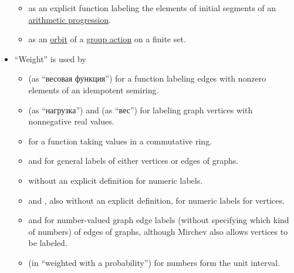 \begin{remark}
\begin{itemize}
\begin{itemize}
      \item {} as an explicit function labeling the elements of initial segments of an \hyperref[def:arithmetic_progression]{arithmetic progression}.

      \item {} as an \hyperref[def:group_action_orbit]{orbit} of a \hyperref[def:group_action]{group action} on a finite set.
    \end{itemize}

    \item \enquote{Weight} is used by
    \begin{itemize}
      \item {} (as \enquote{весовая функция}) for a function labeling edges with nonzero elements of an idempotent semiring.

      \item {} (as \enquote{нагрузка}) and  (as \enquote{вес}) for labeling graph vertices with nonnegative real values.

      \item {} for a function taking values in a commutative ring.


      \item {} and  for general labels of either vertices or edges of graphs.

      \item {} without an explicit definition for numeric labels.

      \item {} and , also without an explicit definition, for numeric labels for vertices.

      \item {} and  for number-valued graph edge labels (without specifying which kind of numbers) of edges of graphs, although Mirchev also allows vertices to be labeled.

      \item {} (in \enquote{weighted with a probability}) for numbers form the unit interval.


\end{itemize}
\end{itemize}
\end{remark}

